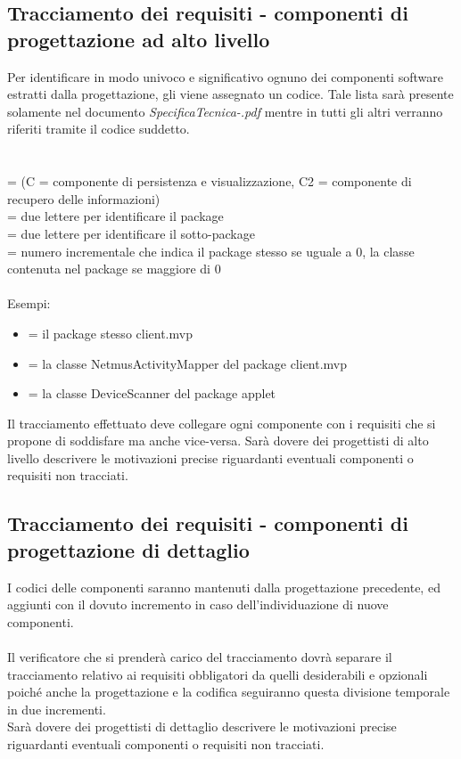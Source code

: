 \subsection{Tracciamento dei requisiti - componenti di progettazione ad alto
livello} Per identificare in modo univoco e significativo ognuno dei componenti
software estratti dalla progettazione, gli viene assegnato un codice.
Tale lista sar\`a presente solamente nel documento
\emph{SpecificaTecnica-\versioneST.pdf} mentre in tutti gli altri verranno
riferiti tramite il codice suddetto.
\\ 
\\
\\
 = (C = componente di persistenza e visualizzazione, C2 = componente di
recupero delle informazioni)\\  = due lettere per identificare il
package\\  = due lettere per identificare il sotto-package\\
 = numero incrementale che indica il package stesso se uguale a 0, la
classe contenuta nel package se maggiore di 0\\ \\
Esempi:
\begin{itemize}
  \item {} = il package stesso client.mvp
  \item {} = la classe NetmusActivityMapper del package client.mvp
  \item {} = la classe DeviceScanner del package applet
\end{itemize}

Il tracciamento effettuato deve collegare ogni componente con i requisiti che si
propone di soddisfare ma anche vice-versa. Sar\`a dovere dei progettisti di alto
livello descrivere le motivazioni precise riguardanti eventuali componenti o
requisiti non tracciati.

\subsection{Tracciamento dei requisiti - componenti di progettazione di
dettaglio} I codici delle componenti saranno mantenuti dalla progettazione precedente, ed
aggiunti con il dovuto incremento in caso dell'individuazione di nuove
componenti.\\\\
Il verificatore che si prender\`a carico del tracciamento dovr\`a separare il
tracciamento relativo ai requisiti obbligatori da quelli desiderabili e
opzionali poich\'e anche la progettazione e la codifica seguiranno questa
divisione temporale in due incrementi.\\
Sar\`a dovere dei progettisti di dettaglio descrivere le motivazioni precise
riguardanti eventuali componenti o requisiti non tracciati.

